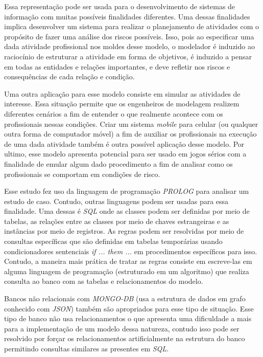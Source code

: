 Essa representação pode ser usada para o desenvolvimento de sistemas de informação com muitas possíveis finalidades diferentes. Uma dessas finalidades implica desenvolver um sistema para realizar o planejamento de atividades com o propósito de fazer uma análise dos riscos possíveis. Isso, pois ao especificar uma dada atividade profissional nos moldes desse modelo, o modelador é induzido ao raciocínio de estruturar a atividade em forma de objetivos, é induzido a pensar em todas as entidades e relações importantes, e deve refletir nos riscos e consequências de cada relação e condição. 

Uma outra aplicação para esse modelo consiste em simular as atividades de interesse. 
Essa situação permite que os engenheiros de modelagem realizem diferentes cenários a fim de entender o que realmente acontece com os profissionais nessas condições. Criar um sistema \textit{mobile} para celular (ou qualquer outra forma de computador móvel) a fim de auxiliar os profissionais na execução de uma dada atividade também é outra possível aplicação desse modelo. Por ultimo, esse modelo apresenta potencial para ser usado em jogos sérios com a finalidade de emular algum dado procedimento a fim 
de analisar como os profissionais se comportam em condições de risco. 

Esse estudo fez uso da linguagem de programação \textit{PROLOG} para analisar um estudo de caso. Contudo, outras linguagens podem ser usadas para essa finalidade. Uma dessas é \textit{SQL} onde as classes podem ser definidas por meio de tabelas, as relações entre as classes por meio de chaves estrangeiras e as instâncias por meio de registros. As regras podem ser resolvidas por meio de consultas específicas que são definidas em tabelas temporárias usando condicionadores sentenciais \textit{if ... them ...} em procedimentos específicos para isso. Contudo, a maneira mais prática de tratar as regras consiste em escreve-las em alguma linguagem de programação (estruturado em um algoritmo) que realiza consulta ao banco com as tabelas e relacionamentos do modelo. 

Bancos não relacionais com \textit{MONGO-DB} (usa a estrutura de dados em grafo conhecido com \textit{JSON}) também são apropriados para esse tipo de situação. Esse tipo 
de banco não usa relacionamentos o que apresenta uma dificuldade a mais para a implementação de um modelo dessa natureza, contudo isso pode ser resolvido por forçar os relacionamentos artificialmente na estrutura do banco permitindo consultas similares as presentes em \textit{SQL}.

